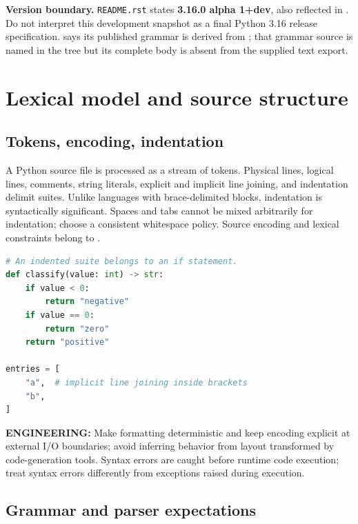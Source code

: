 \documentclass[
  11pt,
]{report}
\newcommand{\passthrough}[1]{#1}
\begin{document}
\textbf{Version boundary.} \passthrough{\lstinline!README.rst!} states
\textbf{3.16.0 alpha 1+dev}, also reflected in
. Do not interpret this
development snapshot as a final Python 3.16 release specification.
 says its published
grammar is derived from ;
that grammar source is named in the tree but its complete body is absent
from the supplied text export.

\chapter{Lexical model and source
structure}\label{lexical-model-and-source-structure}

\section{Tokens, encoding,
indentation}\label{tokens-encoding-indentation}

A Python source file is processed as a stream of tokens. Physical lines,
logical lines, comments, string literals, explicit and implicit line
joining, and indentation delimit suites. Unlike languages with
brace-delimited blocks, indentation is syntactically significant. Spaces
and tabs cannot be mixed arbitrarily for indentation; choose a
consistent whitespace policy. Source encoding and lexical constraints
belong to .

\begin{lstlisting}[language=Python]
# An indented suite belongs to an if statement.
def classify(value: int) -> str:
    if value < 0:
        return "negative"
    if value == 0:
        return "zero"
    return "positive"

entries = [
    "a",  # implicit line joining inside brackets
    "b",
]
\end{lstlisting}

\textbf{ENGINEERING:} Make formatting deterministic and keep encoding
explicit at external I/O boundaries; avoid inferring behavior from
layout transformed by code-generation tools. Syntax errors are caught
before runtime code execution; treat syntax errors differently from
exceptions raised during execution.

\section{Grammar and parser
expectations}\label{grammar-and-parser-expectations}
\end{document}
